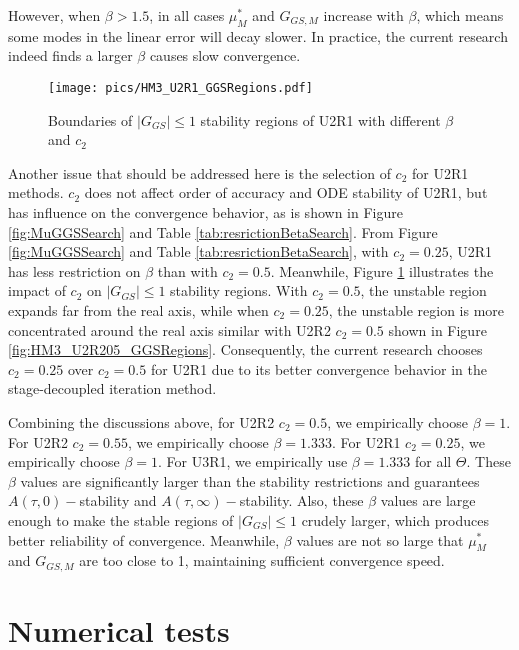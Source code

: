 However, when $\beta>1.5$, in all cases $\mu^*_{M}$ and $G_{GS,M}$ increase
with $\beta$, which means some modes in the linear error will
decay slower. In practice, the current research indeed finds a larger
$\beta$ causes slow convergence.

\begin{figure}[htbp]
    \centering
    \texttt{[image: pics/HM3\_U2R1\_GGSRegions.pdf]}
    \caption[]{Boundaries of $|G_{GS}|\leq1$ stability regions of U2R1 with different $\beta$ and $c_2$}
    \label{fig:HM3_U2R1_GGSRegions}
\end{figure}
Another issue that should be addressed here is the
selection of $c_2$ for U2R1 methods. $c_2$ does not
affect order of accuracy and ODE stability of U2R1, but
has influence on the convergence behavior, as is shown
in Figure \ref{fig:MuGGSSearch} and Table \ref{tab:resrictionBetaSearch}.
From Figure \ref{fig:MuGGSSearch} and Table \ref{tab:resrictionBetaSearch},
with $c_2=0.25$, U2R1 has less restriction on $\beta$ than with $c_2=0.5$.
Meanwhile, Figure \ref{fig:HM3_U2R1_GGSRegions} illustrates the
impact of $c_2$ on $|G_{GS}|\leq1$ stability regions.
With $c_2=0.5$, the unstable region expands far from the real axis,
while when $c_2=0.25$, the unstable region is
more concentrated around the real axis similar with U2R2 $c_2=0.5$
shown in Figure \ref{fig:HM3_U2R205_GGSRegions}.
Consequently, the current research chooses $c_2=0.25$ over $c_2=0.5$
for U2R1 due to its better convergence behavior in
the stage-decoupled iteration method.



Combining the discussions above,
for U2R2 $c_2=0.5$, we empirically choose $\beta = 1$.
For U2R2 $c_2=0.55$, we empirically choose $\beta = 1.333$.
For U2R1 $c_2=0.25$, we empirically choose $\beta = 1$.
For U3R1, we empirically use $\beta = 1.333$ for all $\Theta$.
These $\beta$ values are significantly larger than the
stability restrictions and guarantees
$A(\tau,0)-$stability and
$A(\tau,\infty)-$stability.
Also, these  $\beta$ values are large enough to make the stable regions of $|G_{GS}|\leq1$
crudely larger, which produces better reliability of convergence.
Meanwhile, $\beta$ values are not so large that $\mu^*_{M}$ and $G_{GS,M}$
are too close to 1, maintaining sufficient convergence speed.



\section{Numerical tests}
\label{sec:Results}

